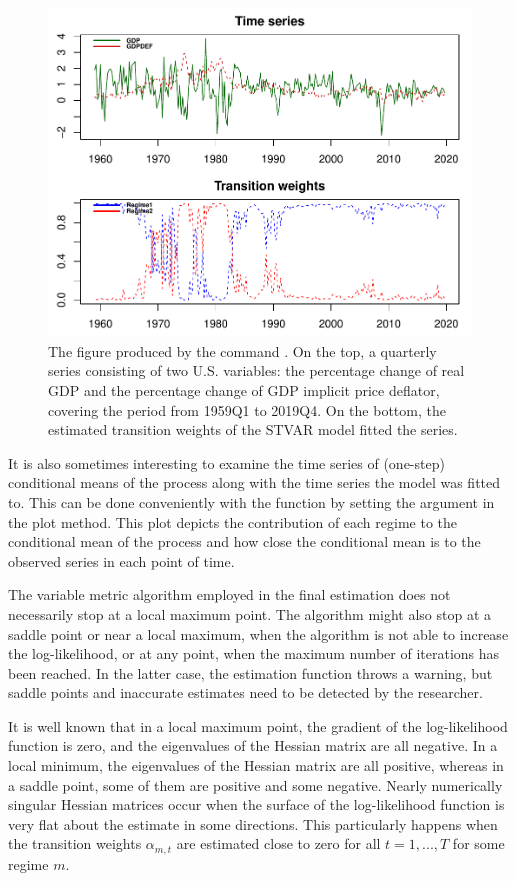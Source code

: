 \documentclass[nojss]{jss}
\begin{document}
\begin{figure}[t]
  \centering
  \includegraphics{figures/seriesplot.pdf}
  \caption{The figure produced by the command . On the top, a quarterly series consisting of two U.S. variables: the percentage change of real GDP and the percentage change of GDP implicit price deflator, covering the period from 1959Q1 to 2019Q4. On the bottom, the estimated transition weights of the STVAR model  fitted the series.}
\label{fig:seriesplot}\end{figure}

It is also sometimes interesting to examine the time series of (one-step) conditional means of the process along with the time series the model was fitted to. This can be done conveniently with the function by setting the argument  in the plot method. This plot depicts the contribution of each regime to the conditional mean of the process and how close the conditional mean is to the observed series in each point of time.

The variable metric algorithm employed in the final estimation does not necessarily stop at a local maximum point. The algorithm might also stop at a saddle point or near a local maximum, when the algorithm is not able to increase the log-likelihood, or at any point, when the maximum number of iterations has been reached. In the latter case, the estimation function throws a warning, but saddle points and inaccurate estimates need to be detected by the researcher.

It is well known that in a local maximum point, the gradient of the log-likelihood function is zero, and the eigenvalues of the Hessian matrix are all negative. In a local minimum, the eigenvalues of the Hessian matrix are all positive, whereas in a saddle point, some of them are positive and some negative. Nearly numerically singular Hessian matrices occur when the surface of the log-likelihood function is very flat about the estimate in some directions. This particularly happens when the transition weights $\alpha_{m,t}$ are estimated close to zero for all $t=1,...,T$ for some regime $m$.
\end{document}
